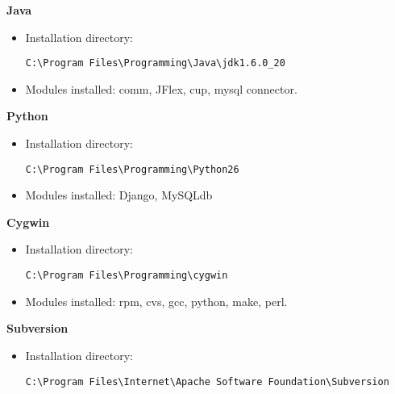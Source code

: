 \textbf{Java}
\begin{itemize}
\item Installation directory: \begin{verbatim}C:\Program Files\Programming\Java\jdk1.6.0_20\end{verbatim}
\item Modules installed: comm, JFlex, cup, mysql connector.
\end{itemize}
\textbf{Python}
\begin{itemize}
\item Installation directory: \begin{verbatim}C:\Program Files\Programming\Python26\end{verbatim}
\item Modules installed: Django, MySQLdb
\end{itemize}
\textbf{Cygwin}
\begin{itemize}
\item Installation directory: \begin{verbatim}C:\Program Files\Programming\cygwin\end{verbatim}
\item Modules installed: rpm, cvs, gcc, python, make, perl.
\end{itemize}
\textbf{Subversion}
\begin{itemize}
\item Installation directory: \begin{verbatim}C:\Program Files\Internet\Apache Software Foundation\Subversion\end{verbatim}
\end{itemize}